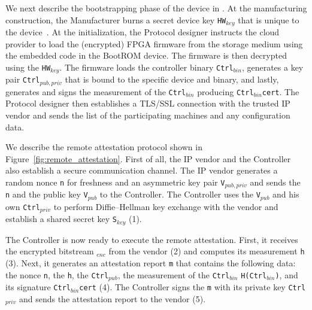  We next describe the bootstrapping phase of the device in \projecttitle{}. At the manufacturing construction, the Manufacturer burns a secret device key \texttt{HW$_{key}$} that is unique to the device~\cite{secure_FPGAs}. At the \projecttitle{} initialization, the Protocol designer instructs the cloud provider to load the (encrypted) FPGA firmware from the storage medium using the embedded code in the BootROM device. The firmware is then decrypted using the \texttt{HW$_{key}$}. The firmware loads the controller binary \texttt{Ctrl$_{bin}$}, generates a key pair \texttt{Ctrl$_{pub, priv}$} that is bound to the specific device and binary, and lastly, generates and signs the measurement of the \texttt{Ctrl$_{bin}$} producing \texttt{Ctrl$_{bin}$cert}. The Protocol designer then establishes a TLS/SSL connection with the trusted IP vendor and sends the list of the participating machines and any configuration data. 

We describe the remote attestation protocol shown in Figure~\ref{fig:remote_attestation}. First of all, the IP vendor and the Controller also establish a secure communication channel. The IP vendor generates a random nonce \texttt{n} for freshness and an asymmetric key pair \texttt{V$_{pub, priv}$} and sends the \texttt{n} and the public key \texttt{V}$_{pub}$ to the Controller. The Controller uses the \texttt{V}$_{pub}$ and his own \texttt{Ctrl}$_{priv}$ to perform Diffie–Hellman key exchange with the vendor and establish a shared secret key \texttt{S$_{key}$} (1).

The Controller is now ready to execute the remote attestation. First, it receives the encrypted bitstream \projecttitle{}$_{enc}$ from the vendor (2) and computes its measurement \texttt{h} (3). Next, it generates an attestation report \texttt{m} that contains the following data: the nonce \texttt{n}, the \texttt{h}, the \texttt{Ctrl$_{pub}$}, the measurement of the \texttt{Ctrl$_{bin}$} \texttt{H(Ctrl$_{bin}$)}, and its signature \texttt{Ctrl$_{bin}$cert} (4). The Controller signs the \texttt{m} with its private key \texttt{Ctrl$_{priv}$} and sends the attestation report to the vendor (5).


